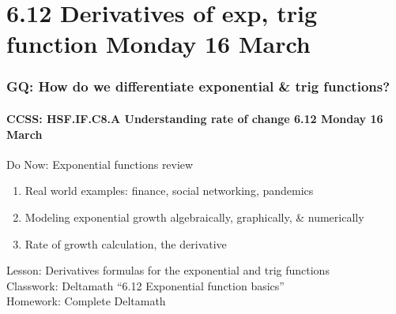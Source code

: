 \documentclass{beamer}
\begin{document}
\section{6.12 Derivatives of exp, trig function \hfill Monday 16 March}
  \frame
  {
    \frametitle{GQ: How do we differentiate exponential \& trig functions?}
    \framesubtitle{CCSS: HSF.IF.C8.A Understanding rate of change \hfill \alert{6.12 Monday 16 March}}
    \begin{block}{Do Now: Exponential functions review}
      \begin{enumerate}
        \item Real world examples: finance, social networking, pandemics
        \item Modeling exponential growth algebraically, graphically, \& numerically
        \item Rate of growth calculation, the derivative
      \end{enumerate}
      \end{block}
      Lesson: Derivatives formulas for the exponential and trig functions \\
      Classwork: Deltamath ``6.12 Exponential function basics'' \\ 
      Homework: Complete Deltamath
      }
\end{document}
